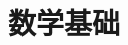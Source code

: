 \documentclass[12pt, a4paper, oneside, UTF8]{ctexbook}
\begin{document}
% 
\else
\fi

\chapter{数学基础}












\ifx\allfiles\undefined
\end{document}
